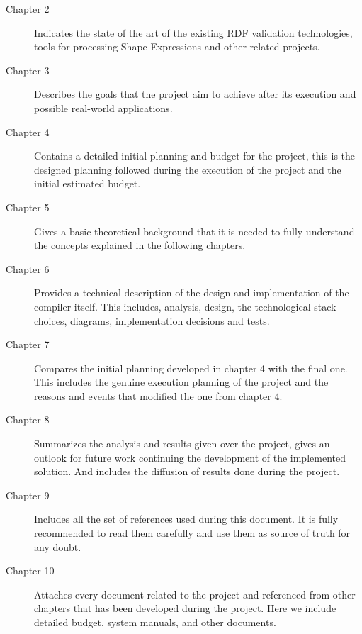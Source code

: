 \begin{description}
	\item[Chapter 2] Indicates the state of the art of the existing RDF validation technologies, tools for processing Shape Expressions and other related projects.
	\item[Chapter 3] Describes the goals that the project aim to achieve after its execution and possible real-world applications.
	\item[Chapter 4] Contains a detailed initial planning and budget for the project, this is the designed planning followed during the execution of the project and the initial estimated budget.
	\item[Chapter 5] Gives a basic theoretical background that it is needed to fully understand the concepts explained in the following chapters.
	\item[Chapter 6] Provides a technical description of the design and implementation of the compiler itself. This includes, analysis, design, the technological stack choices, diagrams, implementation decisions and tests.
	\item[Chapter 7] Compares the initial planning developed in chapter 4 with the final one. This includes the genuine execution planning of the project and the reasons and events that modified the one from chapter 4.
	\item[Chapter 8] Summarizes the analysis and results given over the project, gives an outlook for future work continuing the development of the implemented solution. And includes the diffusion of results done during the project.
	\item[Chapter 9] Includes all the set of references used during this document. It is fully recommended to read them carefully and use them as source of truth for any doubt.
	\item[Chapter 10] Attaches every document related to the project and referenced from other chapters that has been developed during the project. Here we include detailed budget, system manuals, and other documents.
\end{description}
